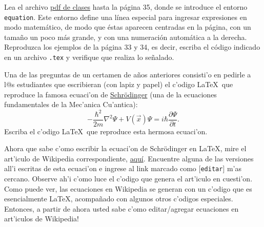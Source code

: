 \documentclass[11pt]{exam}
\begin{document}
\begin{questions}

\item Lea el archivo \href{https://github.com/gfrubi/CC/blob/master/LaTeX/clases-LaTeX.pdf}{pdf de clases} hasta la página 35, donde se introduce el entorno \texttt{equation}. Este entorno define una línea especial para ingresar expresiones en modo matemático, de modo que éstas aparecen centradas en la página, con un tamaño un poco más grande, y con una numeración automática a la derecha. Reproduzca los ejemplos de la página 33 y 34, es decir, escriba el código indicado en un archivo \texttt{.tex} y verifique que realiza lo señalado.

\item Una de las preguntas de un certamen de a\~nos anteriores consisti'o en pedirle a l@s estudiantes que escribieran (con lapiz y papel) el c'odigo \LaTeX\ que reproduce la famosa ecuaci'on de \href{https://es.wikipedia.org/wiki/Erwin_Schr\%C3\%B6dinger}{Schr\"odinger} (una de la ecuaciones fundamentales de la Mec'anica Cu'antica):
\begin{equation}
-\frac{\hbar^2}{2m}\nabla^2\Psi+V(\vec{x})\Psi=i\hbar\frac{\partial\Psi}{\partial t}.
\end{equation}
Escriba el c'odigo \LaTeX\ que reproduce esta hermosa ecuaci'on.

\item Ahora que sabe c'omo escribir la ecuaci'on de Schr\"odinger en \LaTeX, mire el art'iculo de Wikipedia correspondiente, \href{https://es.wikipedia.org/wiki/Ecuaci\%C3\%B3n_de_Schr\%C3\%B6dinger}{aqu\'i}. Encuentre alguna de las versiones all'i escritas de esta ecuaci'on e ingrese al link marcado como [\texttt{editar}] m'as cercano. Observe ah'i c'omo luce el c'odigo que genera el art'iculo en cuesti'on. Como puede ver, las ecuaciones en Wikipedia se generan con un c'odigo que es esencialmente \LaTeX, acompa\~nado con algunos otros c'odigos especiales. Entonces, a partir de ahora usted sabe c'omo editar/agregar ecuaciones en art'iculos de Wikipedia!


\end{questions}
\end{document}
